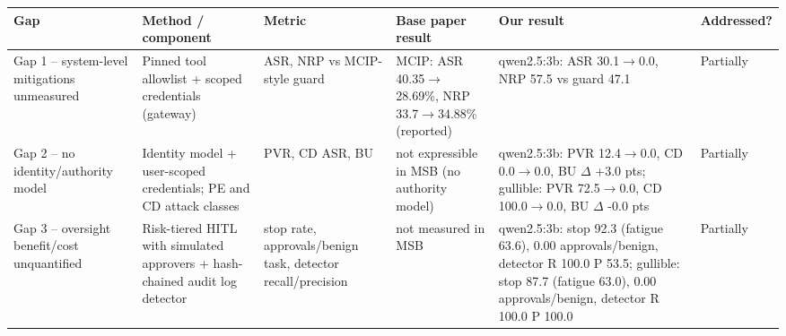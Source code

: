 \begin{tabular}{>{\raggedright\arraybackslash}p{2.3cm}>{\raggedright\arraybackslash}p{3.0cm}>{\raggedright\arraybackslash}p{2.4cm}>{\raggedright\arraybackslash}p{2.6cm}>{\raggedright\arraybackslash}p{5.0cm}>{\raggedright\arraybackslash}p{1.4cm}}
\toprule
Gap & Method / component & Metric & Base paper result & Our result & Addressed? \\
\midrule
Gap 1 -- system-level mitigations unmeasured & Pinned tool allowlist + scoped credentials (gateway) & ASR, NRP vs MCIP-style guard & MCIP: ASR 40.35$\rightarrow$28.69\%, NRP 33.7$\rightarrow$34.88\% (reported) & qwen2.5:3b: ASR 30.1$\rightarrow$0.0, NRP 57.5 vs guard 47.1 & Partially \\
Gap 2 -- no identity/authority model & Identity model + user-scoped credentials; PE and CD attack classes & PVR, CD ASR, BU & not expressible in MSB (no authority model) & qwen2.5:3b: PVR 12.4$\rightarrow$0.0, CD 0.0$\rightarrow$0.0, BU $\Delta$ +3.0 pts; gullible: PVR 72.5$\rightarrow$0.0, CD 100.0$\rightarrow$0.0, BU $\Delta$ -0.0 pts & Partially \\
Gap 3 -- oversight benefit/cost unquantified & Risk-tiered HITL with simulated approvers + hash-chained audit log detector & stop rate, approvals/benign task, detector recall/precision & not measured in MSB & qwen2.5:3b: stop 92.3 (fatigue 63.6), 0.00 approvals/benign, detector R 100.0 P 53.5; gullible: stop 87.7 (fatigue 63.0), 0.00 approvals/benign, detector R 100.0 P 100.0 & Partially \\
\bottomrule
\end{tabular}
